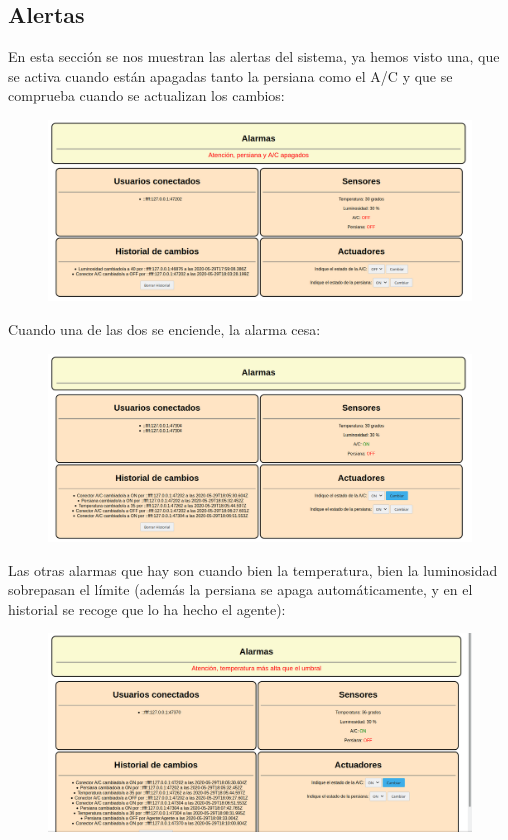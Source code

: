 \documentclass{article}
\begin{document}
	\subsection{Alertas}
	En esta sección se nos muestran las alertas del sistema, ya hemos visto una, que se activa cuando están apagadas tanto la persiana como el A/C y que se comprueba cuando se actualizan los cambios:
	\begin{figure}[H]
		\centering
		\includegraphics[totalheight=5cm]{img/29.png}
	\end{figure}
	Cuando una de las dos se enciende, la alarma cesa:
	\begin{figure}[H]
		\centering
		\includegraphics[totalheight=5cm]{img/30.png}
	\end{figure}
	Las otras alarmas que hay son cuando bien la temperatura, bien la luminosidad sobrepasan el límite (además la persiana se apaga automáticamente, y en el historial se recoge que lo ha hecho el agente):
	\begin{figure}[H]
		\centering
		\includegraphics[totalheight=5cm]{img/31.png}
	\end{figure}
\end{document}
